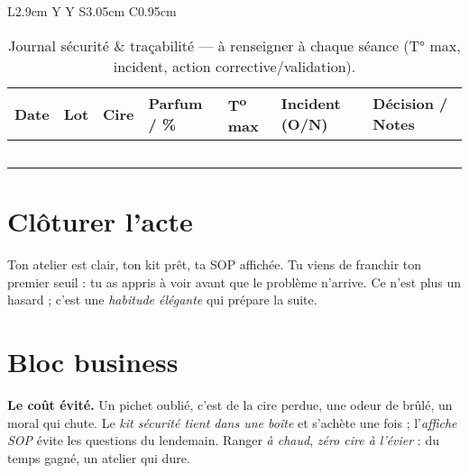 \documentclass[../../main.tex]{subfiles}
\begin{document}
\begin{table}[htbp]
\begin{tabularx}{\linewidth}{L{2.9cm} Y Y S{3.05cm} C{0.95cm}}
\begin{table}[htbp]
  \centering
  \small
  \setlength{\tabcolsep}{4.5pt}
  \renewcommand{\arraystretch}{1.25}
  \begin{tabularx}{\textwidth}{
      >{\centering\arraybackslash}p{1.6cm}
      >{\centering\arraybackslash}p{1.1cm}
      >{\raggedright\arraybackslash}p{1.8cm}
      >{\raggedright\arraybackslash}p{2.0cm}
      >{\centering\arraybackslash}p{1.35cm}
      >{\centering\arraybackslash}p{1.45cm}
      X
  }
    \toprule
    \rowcolor{lightgray!35}
    \textbf{Date} & \textbf{Lot} & \textbf{Cire} & \textbf{Parfum / \%} &
    \textbf{T\textsuperscript{o} max} & \textbf{Incident (O/N)} & \textbf{Décision / Notes} \\
    \midrule
    \rule{0pt}{2.6ex} & & & & & & \\
    & & & & & & \\
    & & & & & & \\
    & & & & & & \\
    & & & & & & \\
    \bottomrule
  \end{tabularx}
  \caption{Journal sécurité \& traçabilité — à renseigner à chaque séance (T° max, incident, action corrective/validation).}
  \label{tab:journal-securite}
\end{table}

\section{Clôturer l’acte}

Ton atelier est clair, ton kit prêt, ta SOP affichée. Tu viens de franchir ton premier seuil : tu as appris à voir avant que le problème n’arrive. Ce n’est plus un hasard ; c’est une \textit{habitude élégante} qui prépare la suite.

\section{Bloc business}

\begin{BlocCouts}
\textbf{Le coût évité.} Un pichet oublié, c’est de la cire perdue, une odeur de brûlé, un moral qui chute. Le \textit{kit sécurité tient dans une boîte} et s’achète une fois ; l’\textit{affiche SOP} évite les questions du lendemain. Ranger \textit{à chaud}, \textit{zéro cire à l’évier} : du temps gagné, un atelier qui dure.
\end{BlocCouts}


\end{tabularx}
\end{table}
\end{document}
